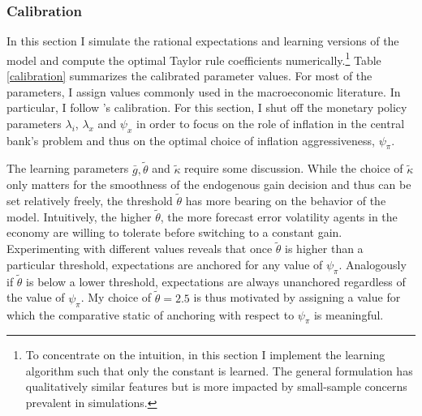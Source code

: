 \documentclass[11pt]{article}
\renewcommand{\[}{\begin{equation}}
\renewcommand{\]}{\end{equation}}
\begin{document}
\subsubsection{Calibration}

In this section I simulate the rational expectations and learning versions of the model and compute the optimal Taylor rule coefficients numerically.\footnote{To concentrate on the intuition, in this section I implement the learning algorithm such that only the constant is learned. The general formulation has qualitatively similar features but is more impacted by small-sample concerns prevalent in simulations.} Table \ref{calibration} summarizes the calibrated parameter values. For most of the parameters, I assign values commonly used in the macroeconomic literature. In particular, I follow \cite{woodford2011interest}'s calibration. For this section, I shut off the monetary policy parameters $\lambda_i$, $\lambda_x$ and $\psi_x$ in order to focus on the role of inflation in the central bank's problem and thus on the optimal choice of inflation aggressiveness, $\psi_{\pi}$.

The learning parameters $\bar{g}, \tilde{\theta}$ and $\tilde{\kappa}$ require some discussion. While the choice of $\tilde{\kappa}$ only matters for the smoothness of the endogenous gain decision and thus can be set relatively freely, the threshold $\tilde{\theta}$ has more bearing on the behavior of the model. Intuitively, the higher $\tilde{\theta}$, the more forecast error volatility agents in the economy are willing to tolerate before switching to a constant gain. Experimenting with different values reveals that once $\tilde{\theta}$ is higher than a particular threshold, expectations are anchored for any value of $\psi_{\pi}$. Analogously if $\tilde{\theta}$ is below a lower threshold, expectations are always unanchored regardless of the value of $\psi_{\pi}$. My choice of $\tilde{\theta}=2.5$ is thus motivated by assigning a value for which the comparative static of anchoring with respect to $\psi_{\pi}$ is meaningful. 
\end{document}
